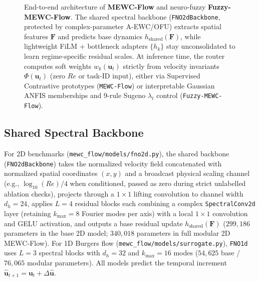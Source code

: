 \documentclass[11pt,a4paper]{article}
\begin{document}
\begin{figure}[!htbp]
{%
}
\caption{End-to-end architecture of \textbf{MEWC-Flow} and neuro-fuzzy \textbf{Fuzzy-MEWC-Flow}. The shared spectral backbone (\texttt{FNO2dBackbone}, protected by complex-parameter A-EWC/OFU) extracts spatial features $\mathbf{F}$ and predicts base dynamics $h_{\text{shared}}(\mathbf{F})$, while lightweight FiLM + bottleneck adapters $\{h_k\}$ stay unconsolidated to learn regime-specific residual scales. At inference time, the router computes soft weights $w_k(\mathbf{u}_t)$ strictly from velocity invariants $\Phi(\mathbf{u}_t)$ (zero $Re$ or task-ID input), either via Supervised Contrastive prototypes (\texttt{MEWC-Flow}) or interpretable Gaussian ANFIS memberships and 9-rule Sugeno $\lambda_t$ control (\texttt{Fuzzy-MEWC-Flow}).}
\label{fig:architecture}
\end{figure}

\subsection{Shared Spectral Backbone}

For 2D benchmarks (\texttt{mewc\_flow/models/fno2d.py}), the shared backbone (\texttt{FNO2dBackbone}) takes the normalized velocity field concatenated with normalized spatial coordinates $(x, y)$ and a broadcast physical scaling channel (e.g., $\log_{10}(Re)/4$ when conditioned, passed as zero during strict unlabelled ablation checks), projects through a $1 \times 1$ lifting convolution to channel width $d_h = 24$, applies $L = 4$ residual blocks each combining a complex \texttt{SpectralConv2d} layer (retaining $k_{\max} = 8$ Fourier modes per axis) with a local $1 \times 1$ convolution and GELU activation, and outputs a base residual update $h_{\text{shared}}(\mathbf{F})$ ($299{,}186$ parameters in the base 2D model; $340{,}018$ parameters in full modular 2D MEWC-Flow). For 1D Burgers flow (\texttt{mewc\_flow/models/surrogate.py}), \texttt{FNO1d} uses $L = 3$ spectral blocks with $d_h = 32$ and $k_{\max} = 16$ modes ($54{,}625$ base / $76{,}065$ modular parameters). All models predict the temporal increment $\hat{\mathbf{u}}_{t+1} = \mathbf{u}_t + \Delta \hat{\mathbf{u}}$.
\end{document}
